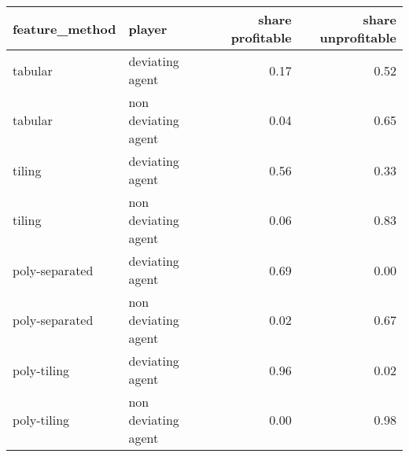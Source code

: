 \begin{tabular}{llrr}
  \hline
feature\_method & player & share profitable & share unprofitable \\ 
  \hline
tabular & deviating agent & 0.17 & 0.52 \\ 
  tabular & non deviating agent & 0.04 & 0.65 \\ 
  tiling & deviating agent & 0.56 & 0.33 \\ 
  tiling & non deviating agent & 0.06 & 0.83 \\ 
  poly-separated & deviating agent & 0.69 & 0.00 \\ 
  poly-separated & non deviating agent & 0.02 & 0.67 \\ 
  poly-tiling & deviating agent & 0.96 & 0.02 \\ 
  poly-tiling & non deviating agent & 0.00 & 0.98 \\ 
   \hline
\end{tabular}

